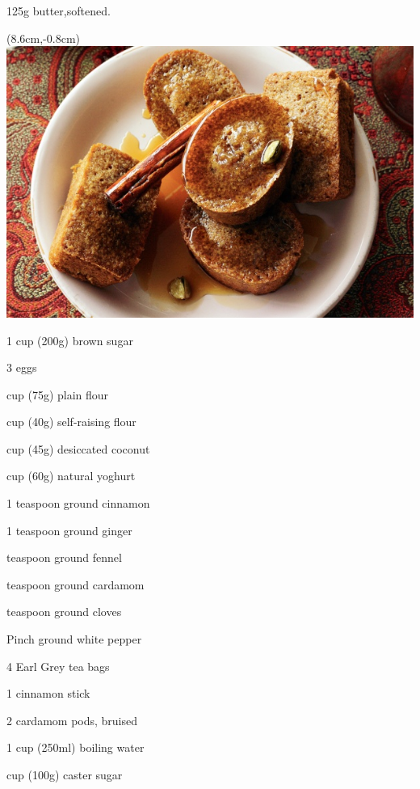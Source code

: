 \begin{ingredients-list}
	\item 125g butter,softened.
		\begin{textblock*}{8cm}(8.6cm,-0.8cm) %
			\includegraphics[scale=0.35]{./img/chai-spiced_cakes.jpg}
		\end{textblock*}
	\item 1 cup (200g) brown sugar
	\item 3 eggs
	\item {} cup (75g) plain flour
	\item {} cup (40g) self-raising flour
	\item {} cup (45g) desiccated coconut
	\item {} cup (60g) natural yoghurt
	\item 1 teaspoon ground cinnamon
	\item 1 teaspoon ground ginger
	\item {} teaspoon ground fennel
	\item {} teaspoon ground cardamom
	\item {} teaspoon ground cloves
	\item Pinch ground white pepper
	\item 4 Earl Grey tea bags
	\item 1 cinnamon stick
	\item 2 cardamom pods, bruised
	\item 1 cup (250ml) boiling water
	\item {} cup (100g) caster sugar 
\end{ingredients-list}

